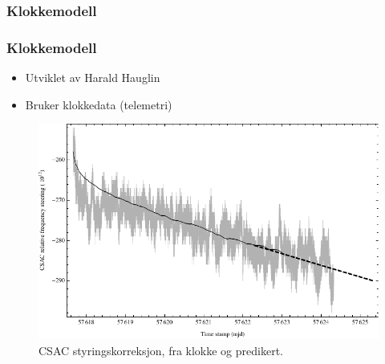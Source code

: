 \documentclass[xcolor=table]{beamer}
\begin{document}
\subsubsection{Klokkemodell}
\begin{frame}
  \frametitle{Klokkemodell}
  \begin{itemize}
    \item Utviklet av Harald Hauglin
    \item Bruker klokkedata (telemetri)
  \end{itemize}
    \begin{figure}
        \includegraphics[scale=0.8]{thesis/graphics/csac_modelling_prediction.pdf}
      \caption{CSAC styringskorreksjon, fra klokke og predikert.}
    \end{figure}
\end{frame}
\end{document}
